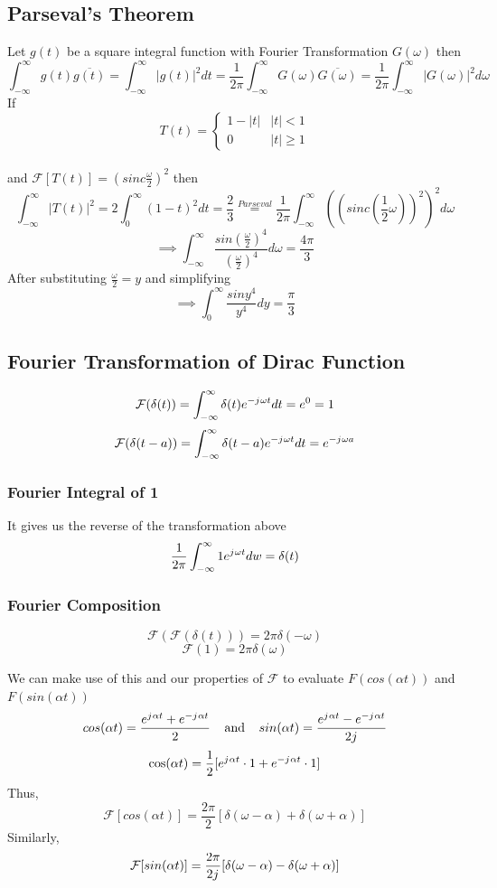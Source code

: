 \documentclass[11pt]{article}
\theoremstyle{definition}
\newcommand{\iu}{{j\mkern1mu}}
\newcommand{\F}{{\mathcal{F}}}
\begin{document}
\subsection{Parseval's Theorem}
Let $g(t)$ be a square integral function with Fourier Transformation $G(\omega)$ then 
$$\int_{-\infty}^\infty g(t) \overline{g(t)} = \int_{-\infty}^\infty |g(t)|^2dt = \frac{1}{2\pi}\int_{-\infty}^\infty G(\omega) \overline{G(\omega)} = \frac{1}{2\pi} \int_{-\infty}^\infty |G(\omega)|^2 d\omega$$
If
\[T(t) =  \begin{cases} 
      1-|t| & |t| < 1 \\
      0 & |t| \geq 1
   \end{cases}
\]\\ and $\F[T(t)] = (sinc\frac{\omega}{2})^2$
then
$$\int_{-\infty}^\infty |T(t)|^2 = 2\int_{0}^\infty (1-t)^2 dt = \frac{2}{3} \stackrel{Parseval}{=} \frac{1}{2\pi}\int_{-\infty}^\infty ((sinc(\frac{1}{2}\omega))^2)^2 d\omega$$
$$\implies \int_{-\infty}^\infty \frac{sin(\frac{\omega}{2})^4}{(\frac{\omega}{2})^4}d\omega = \frac{4\pi}{3}$$
After substituting $\frac{\omega}{2} = y$ and simplifying
$$\implies \int_0^\infty \frac{siny^4}{y^4}dy = \frac{\pi}{3}$$
\newpage
\subsection{Fourier Transformation of Dirac Function}
$$\F(\delta(t)) = \int_{-\infty}^\infty \delta(t) e^{-\iu \omega t }dt = e^0 = 1$$
$$\F(\delta(t-a)) = \int_{-\infty}^\infty \delta(t-a) e^{-\iu \omega t }dt = e^{-\iu \omega a} $$
\subsubsection{Fourier Integral of 1}
It gives us the reverse of the transformation above
$$\frac{1}{2\pi} \int_{-\infty}^\infty 1e^{\iu \omega t} dw = \delta(t)$$
\subsubsection{Fourier Composition}
$$\F(\F(\delta(t))) = 2\pi \delta(-\omega)$$
$$\F(1) = 2\pi \delta(\omega)$$

We can make use of this and our properties of $\F$ to evaluate $F(cos(\alpha t))$ and $F(sin(\alpha t))$ 
$$cos(\alpha t) = \frac{e^{\iu \alpha t} + e^{-\iu \alpha t}}{2} \;\;\;\;\text{and}\;\;\;\; sin(\alpha t) = \frac{e^{\iu \alpha t} - e^{-\iu \alpha t}}{2\iu}$$
$$\cos(\alpha t) = \frac{1}{2}[e^{\iu \alpha t}\cdot 1 + e^{-\iu \alpha t}\cdot 1]$$
Thus,
$$\F[cos(\alpha t)] = \frac{2\pi}{2}[\delta (\omega - \alpha) + \delta(\omega + \alpha)]$$
Similarly,
$$\F[sin(\alpha t)] = \frac{2\pi}{2\iu} [\delta(\omega - \alpha) - \delta(\omega + \alpha)]$$
\end{document}
